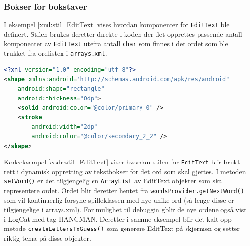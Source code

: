 \subsubsection*{Bokser for bokstaver}
I eksempel \ref{xml:stil_EditText} vises hvordan komponenter for \texttt{EditText} ble definert. Stilen brukes deretter direkte i koden der det opprettes passende antall komponenter av \texttt{EditText} utefra antall \texttt{char} som finnes i det ordet som ble trukket fra ordlisten i \texttt{arrays.xml}. 
\begin{lstlisting}[language=XML, caption=Stil for \texttt{EditText}, label=xml:stil_EditText]
<?xml version="1.0" encoding="utf-8"?>
<shape xmlns:android="http://schemas.android.com/apk/res/android"
    android:shape="rectangle"
    android:thickness="0dp">
    <solid android:color="@color/primary_0" />
    <stroke
        android:width="2dp"
        android:color="@color/secondary_2_2" />
</shape>
\end{lstlisting}

Kodeeksempel \ref{code:stil_EditText} viser hvordan stilen for \texttt{EditText} blir brukt rett i dynamisk oppretting av tekstbokser for det ord som skal gjettes. I metoden \texttt{setWord()} er det tilgjengelig en \texttt{ArrayList} av EditText objekter som skal representere ordet. Ordet blir deretter hentet fra \texttt{wordsProvider.getNextWord()} som vil kontinuerlig forsyne spilleklassen med nye unike ord (så lenge disse er tilgjengelige i arrays.xml). For mulighet til debuggin gblir de nye ordene også vist i LogCat med tag HANGMAN. Deretter i samme eksempel blir det kalt opp metode \texttt{createLettersToGuess()} som generere EditText på skjermen og setter riktig tema på disse objekter.


